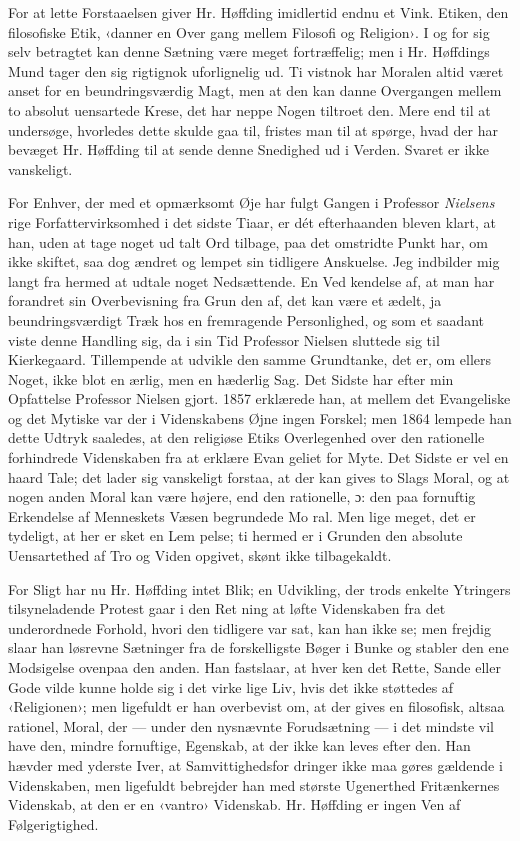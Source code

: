 \documentclass[12pt,a4paper,openany]{book}
\newcommand{\opage}[1]{\marginnote{\footnotesize\textit{[#1]}}}
\begin{document}
For at lette Forstaaelsen giver Hr. Høffding imidlertid
endnu et Vink. Etiken, den filosofiske Etik, ‹danner en Over\-%
gang mellem Filosofi og Religion›. I og for sig selv betragtet
kan denne Sætning være meget fortræffelig; men i Hr. Høffdings
Mund tager den sig rigtignok uforlignelig ud. Ti vistnok har
Moralen altid været anset for en beundringsværdig Magt, men
at den kan danne Overgangen mellem to absolut uensartede
Krese, det har neppe Nogen tiltroet den. Mere end til at
undersøge, hvorledes dette skulde gaa til, fristes man til at
spørge, hvad der har bevæget Hr. Høffding til at sende denne
Snedighed ud i Verden. Svaret er ikke vanskeligt.

For Enhver, der med et opmærksomt Øje har fulgt Gangen
i Professor \emph{Nielsens} rige Forfattervirksomhed i det sidste Tiaar,
er dét efterhaanden bleven klart, at han, uden at tage noget ud%
\opage{15}talt Ord tilbage, paa det omstridte Punkt har, om ikke skiftet,
saa dog ændret og lempet sin tidligere Anskuelse. Jeg indbilder
mig langt fra hermed at udtale noget Nedsættende. En Ved\-%
kendelse af, at man har forandret sin Overbevisning fra Grun\-%
den af, det kan være et ædelt, ja beundringsværdigt Træk hos
en fremragende Personlighed, og som et saadant viste denne
Handling sig, da i sin Tid Professor Nielsen sluttede sig til
Kierkegaard. Tillempende at udvikle den samme Grundtanke,
det er, om ellers Noget, ikke blot en ærlig, men en hæderlig
Sag. Det Sidste har efter min Opfattelse Professor Nielsen gjort.
1857 erklærede han, at mellem det Evangeliske og det Mytiske
var der i Videnskabens Øjne ingen Forskel; men 1864 lempede
han dette Udtryk saaledes, at den religiøse Etiks Overlegenhed
over den rationelle forhindrede Videnskaben fra at erklære Evan\-%
geliet for Myte. Det Sidste er vel en haard Tale; det lader
sig vanskeligt forstaa, at der kan gives to Slags Moral, og at
nogen anden Moral kan være højere, end den rationelle, ɔ: den
paa fornuftig Erkendelse af Menneskets Væsen begrundede Mo\-%
ral. Men lige meget, det er tydeligt, at her er sket en Lem\-%
pelse; ti hermed er i Grunden den absolute Uensartethed af Tro
og Viden opgivet, skønt ikke tilbagekaldt.

For Sligt har nu Hr. Høffding intet Blik; en Udvikling, der
trods enkelte Ytringers tilsyneladende Protest gaar i den Ret\-%
ning at løfte Videnskaben fra det underordnede Forhold, hvori
den tidligere var sat, kan han ikke se; men frejdig slaar han
løsrevne Sætninger fra de forskelligste Bøger i Bunke og stabler
den ene Modsigelse ovenpaa den anden. Han fastslaar, at hver\-%
ken det Rette, Sande eller Gode vilde kunne holde sig i det virke\-%
lige Liv, hvis det ikke støttedes af ‹Religionen›; men ligefuldt
er han overbevist om, at der gives en filosofisk, altsaa rationel,
Moral, der --- under den nysnævnte Forudsætning --- i det mindste
vil have den, mindre fornuftige, Egenskab, at der ikke kan leves
efter den. Han hævder med yderste Iver, at Samvittighedsfor\-%
dringer ikke maa gøres gældende i Videnskaben, men ligefuldt
bebrejder han med største Ugenerthed Fritænkernes Videnskab,
at den er en ‹vantro› Videnskab. Hr. Høffding er ingen Ven af
Følgerigtighed.
\end{document}
